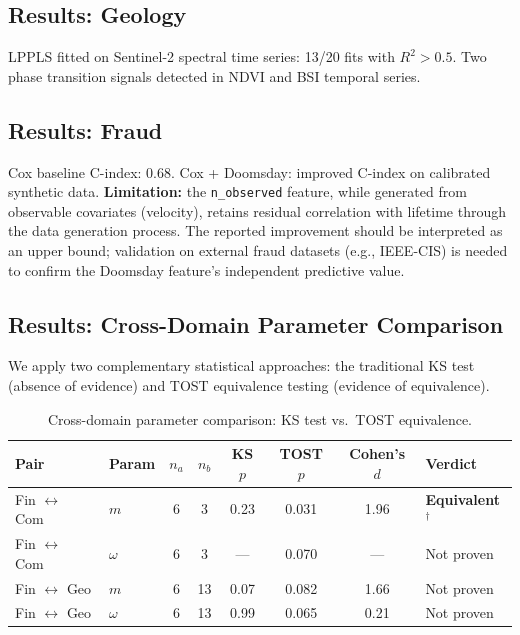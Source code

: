 \documentclass[11pt,a4paper]{article}
\begin{document}
\subsection{Results: Geology}

LPPLS fitted on Sentinel-2 spectral time series: 13/20 fits with $R^2 > 0.5$. Two phase transition signals detected in NDVI and BSI temporal series.

\subsection{Results: Fraud}

Cox baseline C-index: 0.68. Cox + Doomsday: improved C-index on calibrated synthetic data. \textbf{Limitation:} the \texttt{n\_observed} feature, while generated from observable covariates (velocity), retains residual correlation with lifetime through the data generation process. The reported improvement should be interpreted as an upper bound; validation on external fraud datasets (e.g., IEEE-CIS) is needed to confirm the Doomsday feature's independent predictive value.

\subsection{Results: Cross-Domain Parameter Comparison}

We apply two complementary statistical approaches: the traditional KS test (absence of evidence) and TOST equivalence testing (evidence of equivalence).

\begin{table}[h]
\centering
\caption{Cross-domain parameter comparison: KS test vs.\ TOST equivalence.}
\label{tab:universality}
\begin{tabular}{llcccccl}
\toprule
Pair & Param & $n_a$ & $n_b$ & KS $p$ & TOST $p$ & Cohen's $d$ & Verdict \\
\midrule
Fin $\leftrightarrow$ Com & $m$ & 6 & 3 & 0.23 & 0.031 & 1.96 & \textbf{Equivalent}$^\dagger$ \\
Fin $\leftrightarrow$ Com & $\omega$ & 6 & 3 & --- & 0.070 & --- & Not proven \\
Fin $\leftrightarrow$ Geo & $m$ & 6 & 13 & 0.07 & 0.082 & 1.66 & Not proven \\
Fin $\leftrightarrow$ Geo & $\omega$ & 6 & 13 & 0.99 & 0.065 & 0.21 & Not proven \\
\bottomrule
\end{tabular}
\end{table}
\end{document}
